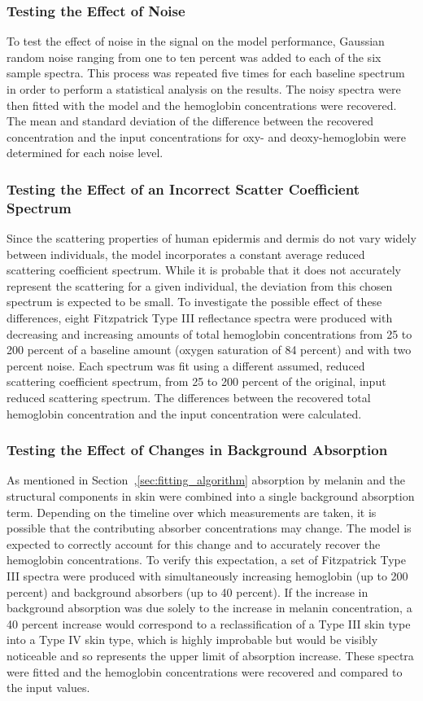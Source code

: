 \subsubsection{Testing the Effect of Noise}
To test the effect of noise in the signal on the model performance, Gaussian random noise ranging from one to ten percent was added to each of the six sample spectra. This process was repeated five times for each baseline spectrum in order to perform a statistical analysis on the results. The noisy spectra were then fitted with the model and the hemoglobin concentrations were recovered. The mean and standard deviation of the difference between the recovered concentration and the input concentrations for oxy- and deoxy-hemoglobin were determined for each noise level.

\subsubsection{Testing the Effect of an Incorrect Scatter Coefficient Spectrum}
Since the scattering properties of human epidermis and dermis do not vary widely between individuals, the model incorporates a constant average reduced scattering coefficient spectrum. While it is probable that it does not accurately represent the scattering for a given individual, the deviation from this chosen spectrum is expected to be small. To investigate the possible effect of these differences, eight Fitzpatrick Type III reflectance spectra were produced with decreasing and increasing amounts of total hemoglobin concentrations from 25 to 200 percent of a baseline amount (oxygen saturation of 84 percent)\cite{Arimoto2006} and with two percent noise. Each spectrum was fit using a different assumed, reduced scattering coefficient spectrum, from 25 to 200 percent of the original, input reduced scattering spectrum. The differences between the recovered total hemoglobin concentration and the input concentration were calculated.

\subsubsection{Testing the Effect of Changes in Background Absorption}
As mentioned in Section~,\ref{sec:fitting_algorithm} absorption by melanin and the structural components in skin were combined into a single background absorption term. Depending on the timeline over which measurements are taken, it is possible that the contributing absorber concentrations may change. The model is expected to correctly account for this change and to accurately recover the hemoglobin concentrations. To verify this expectation, a set of Fitzpatrick Type III spectra were produced with simultaneously increasing hemoglobin (up to 200 percent) and background absorbers (up to 40 percent). If the increase in background absorption was due solely to the increase in melanin concentration, a 40 percent increase would correspond to a reclassification of a Type III skin type into a Type IV skin type, which is highly improbable but would be visibly noticeable and so represents the upper limit of absorption increase. These spectra were fitted and the hemoglobin concentrations were recovered and compared to the input values.


